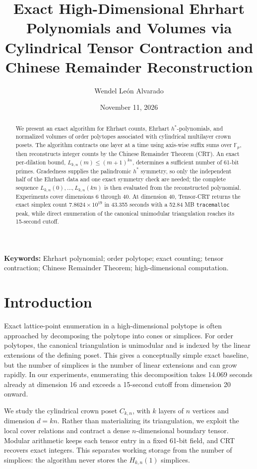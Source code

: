 \documentclass[11pt]{article}
\title{Exact High-Dimensional Ehrhart Polynomials and Volumes via Cylindrical Tensor Contraction and Chinese Remainder Reconstruction}
\author{Wendel León Alvarado}
\date{November 11, 2026}
\newcommand{\Fp}{\mathbb{F}_p}
\begin{document}
\maketitle

\begin{abstract}
We present an exact algorithm for Ehrhart counts, Ehrhart $h^*$-polynomials,
and normalized volumes of order polytopes associated with cylindrical
multilayer crown posets.  The algorithm contracts one layer at a time using
axis-wise suffix sums over $\Fp$, then reconstructs integer counts by the
Chinese Remainder Theorem (CRT).  An exact per-dilation bound,
$L_{k,n}(m)\leq (m+1)^{kn}$, determines a sufficient number of 61-bit
primes.  Gradedness supplies the palindromic $h^*$ symmetry, so only the
independent half of the Ehrhart data and one exact symmetry check are needed;
the complete sequence $L_{k,n}(0),\ldots,L_{k,n}(kn)$ is then evaluated from
the reconstructed polynomial.  Experiments cover dimensions 6 through 40.
At dimension 40, Tensor-CRT returns the exact simplex count
$7.8624\times 10^{19}$ in 43.355 seconds with a 52.84 MB
\texttt{tracemalloc} peak, while direct enumeration of the canonical
unimodular triangulation reaches its 15-second cutoff.
\end{abstract}

\noindent\textbf{Keywords:}
Ehrhart polynomial; order polytope; exact counting; tensor contraction;
Chinese Remainder Theorem; high-dimensional computation.

\section{Introduction}

Exact lattice-point enumeration in a high-dimensional polytope is often
approached by decomposing the polytope into cones or simplices.  For order
polytopes, the canonical triangulation is unimodular and is indexed by the
linear extensions of the defining poset.  This gives a conceptually simple
exact baseline, but the number of simplices is the number of linear
extensions and can grow rapidly.  In our experiments, enumerating this
decomposition takes 14.069 seconds already at dimension 16 and exceeds a
15-second cutoff from dimension 20 onward.

We study the cylindrical crown poset $C_{k,n}$, with $k$ layers of $n$
vertices and dimension $d=kn$.  Rather than materializing its triangulation,
we exploit the local cover relations and contract a dense $n$-dimensional
boundary tensor.  Modular arithmetic keeps each tensor entry in a fixed
61-bit field, and CRT recovers exact integers.  This separates working
storage from the number of simplices: the algorithm never stores the
$H_{k,n}(1)$ simplices.
\end{document}
